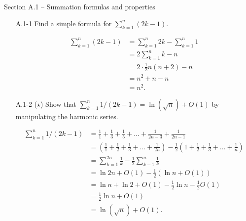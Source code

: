 \documentclass{report}
\makeatletter
\renewenvironment{framed}{%
 \def\FrameCommand##1{\hskip\@totalleftmargin
 \fboxsep=\FrameSep\fbox{##1}}%
 \MakeFramed {\advance\hsize-\width
   \@totalleftmargin\z@ \linewidth\hsize
   \@setminipage}}%
 {\par\unskip\endMakeFramed}
\makeatother
\begin{document}
\small

{\large Section A.1 {--} Summation formulas and properties}

\begin{enumerate}

\item[A.1{-}1] {Find a simple formula for $\sum_{k = 1}^{n} (2k - 1)$.}

\begin{framed}
\begin{equation*}
\begin{aligned}
  \sum_{k = 1}^{n} (2k - 1) &= \sum_{k = 1}^{n} 2k - \sum_{k = 1}^{n} 1\\
                            &= 2 \sum_{k = 1}^{n} k - n\\
                            &= 2 \cdot \frac{1}{2} n (n + 2) - n\\
                            &= n^2 + n - n\\
                            &= n^2.
\end{aligned}
\end{equation*}
\end{framed}

\item[A.1{-}2] {($\star$) Show that
$\sum_{k = 1}^{n} 1/(2k - 1) = \ln(\sqrt n) + O(1)$ by manipulating the harmonic
series.}

\begin{framed}
\begin{equation*}
\begin{aligned}
  \sum_{k = 1}^{n} 1/(2k - 1) &= \frac{1}{1} + \frac{1}{3} + \frac{1}{5} + \dots + \frac{1}{2n - 3} + \frac{1}{2n - 1}\\
                              &= \left(\frac{1}{1} + \frac{1}{2} + \frac{1}{3} + \dots + \frac{1}{2n}\right)
                              - \frac{1}{2} \left(1 + \frac{1}{2} + \frac{1}{3} + \dots + \frac{1}{n}\right)\\
                              &= \sum_{k = 1}^{2n} \frac{1}{k} - \frac{1}{2} \sum_{k - 1}^{n} \frac{1}{k}\\
                              &= \ln{2n} + O(1) - \frac{1}{2} (\ln n + O(1))\\
                              &= \ln n + \ln 2 + O(1) - \frac{1}{2} \ln n - \frac{1}{2} O(1)\\
                              &= \frac{1}{2} \ln n + O(1)\\
                              &= \ln(\sqrt n) + O(1).
\end{aligned}
\end{equation*}
\end{framed}


\end{enumerate}
\end{document}
